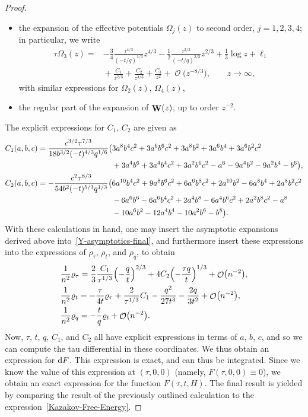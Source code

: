 \documentclass[10pt,a4paper]{amsart}
\DeclareMathOperator{\OO}{\mathcal{O}}
\DeclareMathOperator{\WW}{{\bf W}}
\numberwithin{equation}{section}
\begin{document}
\begin{proof}
\begin{itemize}
 \item the expansion of the effective potentials $\Omega_j(z)$ to second order, $j=1,2,3,4$; in particular, we write
 \begin{align*}
 \tau \Omega_3(z) ={}&{-}\frac{3}{4}\frac{\tau^{4/3}}{(-t/q)^{1/3}}z^{4/3} - \frac{1}{2}\frac{\tau^{2/3}}{(-t/q)^{2/3}}z^{2/3} + \frac{1}{3}\log z + \ell_1\\
 &{}+ \frac{C_1}{z^{2/3}} + \frac{C_2}{z^{4/3}} + \frac{C_3}{z^2} + \OO\bigl(z^{-8/3}\bigr), \qquad z\to \infty,
 \end{align*}
 with similar expressions for $\Omega_2(z)$, $\Omega_4(z)$,
 \item the regular part of the expansion of $\WW(z)$, up to order $z^{-2}$.
 \end{itemize}

 The explicit expressions for $C_1$, $C_2$ are given as
 \begin{align*}
 C_1(a,b,c)={}& \frac{c^{3/2}\tau^{7/3}}{18b^{3/2}(-t)^{4/3}q^{1/6}}\bigl(3a^8b^4c^2 + 3a^6b^6c^2 + 3a^8b^2 + 3a^6b^4 + 3a^6b^2c^2\nonumber\\
 &\hphantom{\frac{c^{3/2}\tau^{7/3}}{18b^{3/2}(-t)^{4/3}q^{1/6}}\bigl(}{}
 + 3a^4b^6 + 3a^4b^4c^2 + 3a^2b^6c^2 - a^6 - 9a^4b^2 - 9a^2b^4 - b^6\bigr),\\
 C_2(a,b,c)={}& {-}\frac{c^2 \tau^{8/3}}{54 b^2 (-t)^{5/3} q^{1/3}} \bigl( 6a^{10}b^4c^2 + 9a^8b^6c^2 + 6a^6b^8c^2 + 2a^{10}b^2 - 6a^8b^4 + 2a^8b^2c^2 \nonumber\\
 &\hphantom{{-}\frac{c^2 \tau^{8/3}}{54 b^2 (-t)^{5/3} q^{1/3}} \bigl(}{}
 -6a^6b^6 - 6a^6b^4c^2 + 2a^4b^8 - 6a^4b^6c^2 + 2a^2b^8c^2 - a^8\\
 &\hphantom{{-}\frac{c^2 \tau^{8/3}}{54 b^2 (-t)^{5/3} q^{1/3}} \bigl(}{}
 - 10a^6b^2 - 12a^4b^4 - 10a^2b^6 - b^8\bigr).
 \end{align*}
 With these calculations in hand, one may insert the asymptotic expansions derived above into~\eqref{Y-asymptotics-final}, and furthermore insert these expressions into the expressions of
 $\rho_{\tau}$, $\rho_t$, and $\rho_q$, to obtain
 \begin{align*}
 &\frac{1}{n^2}\varrho_{\tau}= \frac{2}{3}\frac{C_1}{\tau^{1/3}} \Bigl(-\frac{q}{t}\Bigr)^{2/3} + 4 C_2\Bigl(-\frac{\tau q}{t}\Bigr)^{1/3} + \OO\bigl(n^{-2}\bigr),\\
 &\frac{1}{n^2}\varrho_t= -\frac{\tau}{4t}\varrho_\tau +\frac{2}{\tau^{1/3}}C_1 -\frac{q^2}{27t^3} - \frac{2q}{3t^2} + \OO\bigl(n^{-2}\bigr),\\
 &\frac{1}{n^2}\varrho_q= -\frac{t}{q}\varrho_t + \OO\bigl(n^{-2}\bigr).
 \end{align*}
 Now, $\tau$, $t$, $q$, $C_1$, and $C_2$ all have explicit expressions in terms of $a$, $b$, $c$, and so we can compute the tau differential in these coordinates. We thus obtain an expression for ${\rm d}F$. This expression is exact,
 and can thus be integrated. Since we know the value of this expression at $(\tau,0,0)$ (namely, $F(\tau,0,0)\equiv 0$), we obtain an exact expression for the function $F(\tau,t,H)$. The final result is yielded by comparing the result of the previously outlined calculation to the expression~\eqref{Kazakov-Free-Energy}.
\end{proof}
\end{document}
